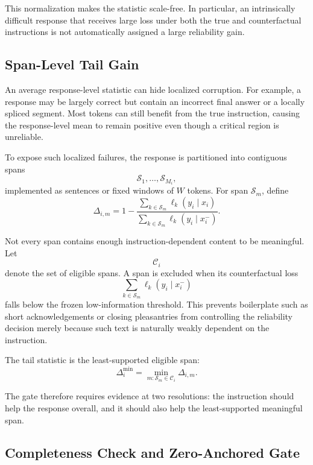 This normalization makes the statistic scale-free. In particular, an
intrinsically difficult response that receives large loss under both
the true and counterfactual instructions is not automatically assigned
a large reliability gain.


\subsection{Span-Level Tail Gain}
\label{app:gate-span-gain}

An average response-level statistic can hide localized corruption.
For example, a response may be largely correct but contain an
incorrect final answer or a locally spliced segment. Most tokens can
still benefit from the true instruction, causing the response-level
mean to remain positive even though a critical region is unreliable.

To expose such localized failures, the response is partitioned into
contiguous spans
\[
\mathcal S_1,\ldots,\mathcal S_{M_i},
\]
implemented as sentences or fixed windows of \(W\) tokens. For span
\(\mathcal S_m\), define
\begin{equation}
\Delta_{i,m}
=
1-
\frac{
\sum_{k\in\mathcal S_m}
\ell_k(y_i\mid x_i)
}{
\sum_{k\in\mathcal S_m}
\ell_k(y_i\mid x_i^{-})
}.
\label{eq:gate-span-gain}
\end{equation}

Not every span contains enough instruction-dependent content to be
meaningful. Let
\[
\mathcal C_i
\]
denote the set of eligible spans. A span is excluded when its
counterfactual loss
\[
\sum_{k\in\mathcal S_m}
\ell_k(y_i\mid x_i^{-})
\]
falls below the frozen low-information threshold. This prevents
boilerplate such as short acknowledgements or closing pleasantries
from controlling the reliability decision merely because such text
is naturally weakly dependent on the instruction.

The tail statistic is the least-supported eligible span:
\begin{equation}
\Delta_i^{\min}
=
\min_{m:\mathcal S_m\in\mathcal C_i}
\Delta_{i,m}.
\label{eq:gate-tail-gain}
\end{equation}

The gate therefore requires evidence at two resolutions: the
instruction should help the response overall, and it should also help
the least-supported meaningful span.


\subsection{Completeness Check and Zero-Anchored Gate}
\label{app:gate-final}

